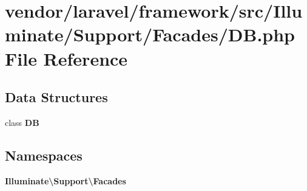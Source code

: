 \section{vendor/laravel/framework/src/\+Illuminate/\+Support/\+Facades/\+D\+B.php File Reference}
\label{_d_b_8php}
\subsection*{Data Structures}
\begin{DoxyCompactItemize}
\item 
class {\bf D\+B}
\end{DoxyCompactItemize}
\subsection*{Namespaces}
\begin{DoxyCompactItemize}
\item 
 {\bf Illuminate\textbackslash{}\+Support\textbackslash{}\+Facades}
\end{DoxyCompactItemize}
